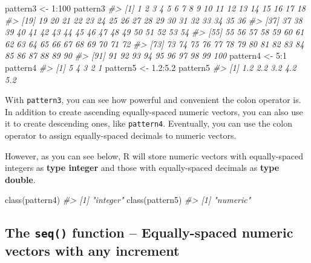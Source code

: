 \documentclass[
]{book}
\newenvironment{Shaded}{\begin{snugshade}}{\end{snugshade}}
\newcommand{\CommentTok}[1]{\textcolor[rgb]{0.56,0.35,0.01}{\textit{#1}}}
\newcommand{\DecValTok}[1]{\textcolor[rgb]{0.00,0.00,0.81}{#1}}
\newcommand{\FloatTok}[1]{\textcolor[rgb]{0.00,0.00,0.81}{#1}}
\newcommand{\FunctionTok}[1]{\textcolor[rgb]{0.00,0.00,0.00}{#1}}
\newcommand{\NormalTok}[1]{#1}
\newcommand{\OtherTok}[1]{\textcolor[rgb]{0.56,0.35,0.01}{#1}}
\newcommand{\SpecialCharTok}[1]{\textcolor[rgb]{0.00,0.00,0.00}{#1}}
\begin{document}
\begin{Shaded}
\begin{Highlighting}[]
\NormalTok{pattern3 }\OtherTok{\textless{}{-}} \DecValTok{1}\SpecialCharTok{:}\DecValTok{100}
\NormalTok{pattern3}
\CommentTok{\#\textgreater{}   [1]   1   2   3   4   5   6   7   8   9  10  11  12  13  14  15  16  17  18}
\CommentTok{\#\textgreater{}  [19]  19  20  21  22  23  24  25  26  27  28  29  30  31  32  33  34  35  36}
\CommentTok{\#\textgreater{}  [37]  37  38  39  40  41  42  43  44  45  46  47  48  49  50  51  52  53  54}
\CommentTok{\#\textgreater{}  [55]  55  56  57  58  59  60  61  62  63  64  65  66  67  68  69  70  71  72}
\CommentTok{\#\textgreater{}  [73]  73  74  75  76  77  78  79  80  81  82  83  84  85  86  87  88  89  90}
\CommentTok{\#\textgreater{}  [91]  91  92  93  94  95  96  97  98  99 100}
\NormalTok{pattern4 }\OtherTok{\textless{}{-}} \DecValTok{5}\SpecialCharTok{:}\DecValTok{1}
\NormalTok{pattern4}
\CommentTok{\#\textgreater{} [1] 5 4 3 2 1}
\NormalTok{pattern5 }\OtherTok{\textless{}{-}} \FloatTok{1.2}\SpecialCharTok{:}\FloatTok{5.2}
\NormalTok{pattern5}
\CommentTok{\#\textgreater{} [1] 1.2 2.2 3.2 4.2 5.2}
\end{Highlighting}
\end{Shaded}

With \texttt{pattern3}, you can see how powerful and convenient the colon operator is. In addition to create ascending equally-spaced numeric vectors, you can also use it to create descending ones, like \texttt{pattern4}. Eventually, you can use the colon operator to assign equally-spaced decimals to numeric vectors.

However, as you can see below, R will store numeric vectors with equally-spaced integers as \textbf{type integer} and those with equally-spaced decimals as \textbf{type double}.

\begin{Shaded}
\begin{Highlighting}[]
\FunctionTok{class}\NormalTok{(pattern4)}
\CommentTok{\#\textgreater{} [1] "integer"}
\FunctionTok{class}\NormalTok{(pattern5)}
\CommentTok{\#\textgreater{} [1] "numeric"}
\end{Highlighting}
\end{Shaded}

\hypertarget{the-seq-function-equally-spaced-numeric-vectors-with-any-increment}{%
\subsection{\texorpdfstring{The \texttt{seq()} function -- Equally-spaced numeric vectors with any increment}{The seq() function -- Equally-spaced numeric vectors with any increment}}\label{the-seq-function-equally-spaced-numeric-vectors-with-any-increment}}
\end{document}

